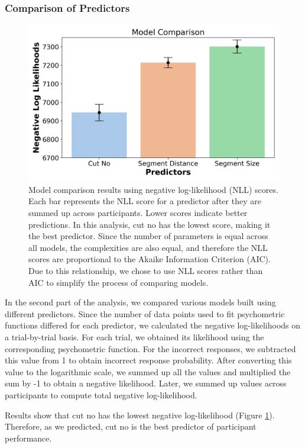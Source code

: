 \documentclass{article}
\begin{document}
\subsubsection{Comparison of Predictors}
\begin{figure}[!hb]
    \centering
    \includegraphics[width=1\textwidth]{plots/psych_modelCompAgg.png}    
    \caption{Model comparison results using negative log-likelihood (NLL) scores. Each bar represents the NLL score for a predictor after they are summed up across participants. Lower scores indicate better predictions. In this analysis, cut no has the lowest score, making it the best predictor. Since the number of parameters is equal across all models, the complexities are also equal, and therefore the NLL scores are proportional to the Akaike Information Criterion (AIC). Due to this relationship, we chose to use NLL scores rather than AIC to simplify the process of comparing models.}
    \label{fig:psych_loglike}
\end{figure}

In the second part of the analysis, we compared various models built using different predictors. Since the number of data points used to fit psychometric functions differed for each predictor, we calculated the negative log-likelihoods on a trial-by-trial basis. For each trial, we obtained its likelihood using the corresponding psychometric function. For the incorrect responses, we subtracted this value from 1 to obtain incorrect response probability. After converting this value to the logarithmic scale, we summed up all the values and multiplied the sum by -1 to obtain a negative likelihood. Later, we summed up values across participants to compute total negative log-likelihood.

Results show that cut no has the lowest negative log-likelihood (Figure \ref{fig:psych_loglike}). Therefore, as we predicted, cut no is the best predictor of participant performance.
\end{document}
